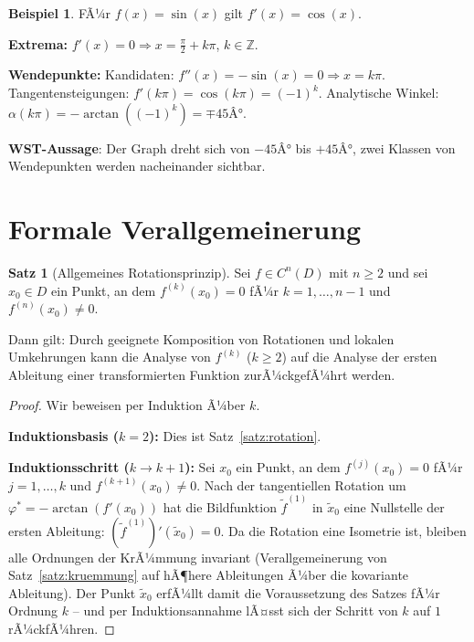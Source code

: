 ﻿\documentclass[12pt, a4paper]{article}
\theoremstyle{definition}
\newtheorem{satz}{Satz}[section]
\newtheorem{beispiel}{Beispiel}[section]
\begin{document}
	\begin{beispiel}
		FÃ¼r $f(x) = \sin(x)$ gilt $f'(x) = \cos(x)$.
		
		\textbf{Extrema:} $f'(x) = 0 \Rightarrow x = \frac{\pi}{2} + k\pi$, $k \in \mathbb{Z}$.
		
		\textbf{Wendepunkte:} Kandidaten: $f''(x) = -\sin(x) = 0 \Rightarrow x = k\pi$.
		Tangentensteigungen: $f'(k\pi) = \cos(k\pi) = (-1)^k$.
		Analytische Winkel: $\alpha(k\pi) = -\arctan((-1)^k) = \mp 45Â°$.
		
		\textbf{WST-Aussage}: Der Graph dreht sich von $-45Â°$ bis $+45Â°$, zwei Klassen
		von Wendepunkten werden nacheinander sichtbar.
	\end{beispiel}
	
	\section{Formale Verallgemeinerung}
	
	\begin{satz}[Allgemeines Rotationsprinzip]\label{satz:allgemein}
		Sei $f \in C^n(D)$ mit $n \geq 2$ und sei $x_0 \in D$ ein Punkt, an dem
		$f^{(k)}(x_0) = 0$ fÃ¼r $k = 1, \ldots, n-1$ und $f^{(n)}(x_0) \neq 0$.
		
		Dann gilt: Durch geeignete Komposition von Rotationen und lokalen
		Umkehrungen kann die Analyse von $f^{(k)}$ ($k \geq 2$) auf die Analyse
		der ersten Ableitung einer transformierten Funktion zurÃ¼ckgefÃ¼hrt werden.
	\end{satz}
	
	\begin{proof}
		Wir beweisen per Induktion Ã¼ber $k$.
		
		\textbf{Induktionsbasis ($k = 2$):} Dies ist Satz~\ref{satz:rotation}.
		
		\textbf{Induktionsschritt ($k \to k+1$):} Sei $x_0$ ein Punkt, an dem
		$f^{(j)}(x_0) = 0$ fÃ¼r $j = 1, \ldots, k$ und $f^{(k+1)}(x_0) \neq 0$.
		Nach der tangentiellen Rotation um $\varphi^* = -\arctan(f'(x_0))$ hat die
		Bildfunktion $\tilde{f}^{(1)}$ in $\tilde{x}_0$ eine Nullstelle der
		ersten Ableitung: $(\tilde{f}^{(1)})'(\tilde{x}_0) = 0$.
		Da die Rotation eine Isometrie ist, bleiben alle Ordnungen der KrÃ¼mmung
		invariant (Verallgemeinerung von Satz~\ref{satz:kruemmung} auf hÃ¶here Ableitungen
		Ã¼ber die kovariante Ableitung). Der Punkt $\tilde{x}_0$ erfÃ¼llt damit die
		Voraussetzung des Satzes fÃ¼r Ordnung $k$ -- und per Induktionsannahme
		lÃ¤sst sich der Schritt von $k$ auf $1$ rÃ¼ckfÃ¼hren.
	\end{proof}
	
\end{document}
